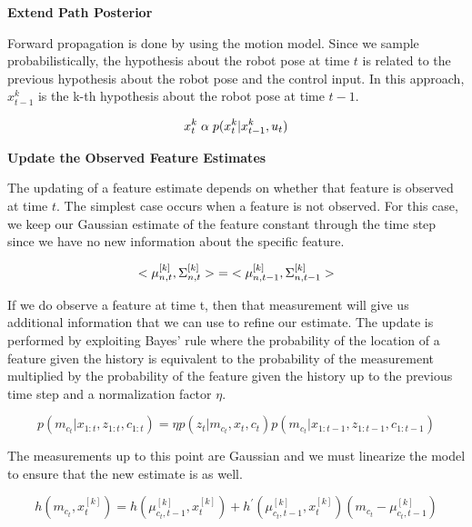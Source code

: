 \documentclass[twoside]{article}
\begin{document}
\textbf{Extend Path Posterior}

Forward propagation is done by using the motion model. Since we sample probabilistically, the hypothesis about the robot pose at time $t$ is related to the previous hypothesis about the robot pose and the control input. In this approach, $x_{t-1}^{k}$ is the k-th hypothesis about the robot pose at time $t-1$.

\begin{equation}
x_t^{k} \hspace*{1mm} \alpha \hspace*{1mm} p( x_t^{k} | x_{t-1}^{k} , u_t)\nonumber
\end{equation}

\textbf{Update the Observed Feature Estimates}

The updating of a feature estimate depends on whether that feature is observed at time $t$. The simplest case occurs when a feature is not observed. For this case, we keep our Gaussian estimate of the feature constant through the time step since we have no new information about the specific feature.

\begin{equation}
<\mu_{n,t}^{[k]},\Sigma_{n,t}^{[k]}> \hspace*{1mm} = \hspace*{1mm} <\mu_{n,t-1}^{[k]},\Sigma_{n,t-1}^{[k]}>\nonumber
\end{equation}

If we do observe a feature at time t, then that measurement will give us additional information that we can use to refine our estimate. The update is performed by exploiting Bayes' rule where the probability of the location of a feature given the history is equivalent to the probability of the measurement multiplied by the probability of the feature given the history up to the previous time step and a normalization factor $\eta$.

\begin{equation}
p(m_{c_t} | x_{1:t}, z_{1:t}, c_{1:t}) = \eta p(z_t | m_{c_t},x_t,c_t)p(m_{c_t} | x_{1:t-1}, z_{1:t-1}, c_{1:t-1})
\end{equation}

The measurements up to this point are Gaussian and we must linearize the model to ensure that the new estimate is as well.

\begin{equation}
h(m_{c_t},x_t^{[k]}) = h(\mu_{c_t,t-1}^{[k]},x_t^{[k]})+h^{'}(\mu_{c_t,t-1}^{[k]},x_t^{[k]})(m_{c_t}-\mu_{c_t,t-1}^{[k]})
\end{equation}
\end{document}
